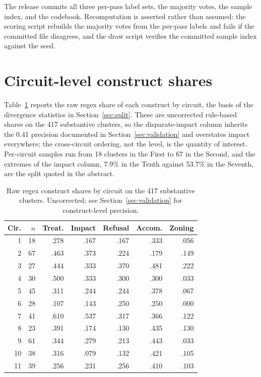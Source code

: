\documentclass[11pt]{article}
\begin{document}
The release commits all three per-pass label sets, the majority votes, the sample index, and the codebook. Recomputation is asserted rather than assumed: the scoring script rebuilds the majority votes from the per-pass labels and fails if the committed file disagrees, and the draw script verifies the committed sample index against the seed.

\section{Circuit-level construct shares}\label{app:circuit}

Table~\ref{tab:circuits} reports the raw regex share of each construct by circuit, the basis of the divergence statistics in Section~\ref{sec:split}. These are uncorrected rule-based shares on the 417 substantive clusters, so the disparate-impact column inherits the 0.41 precision documented in Section~\ref{sec:validation} and overstates impact everywhere; the cross-circuit ordering, not the level, is the quantity of interest. Per-circuit samples run from 18 clusters in the First to 67 in the Second, and the extremes of the impact column, 7.9\% in the Tenth against 53.7\% in the Seventh, are the split quoted in the abstract.

\begin{table}[h]
\centering\small
\setlength{\tabcolsep}{4pt}
\begin{tabular}{rrrrrrr}
\toprule
Cir. & $n$ & Treat. & Impact & Refusal & Accom. & Zoning \\
\midrule
1 & 18 & .278 & .167 & .167 & .333 & .056 \\
2 & 67 & .463 & .373 & .224 & .179 & .149 \\
3 & 27 & .444 & .333 & .370 & .481 & .222 \\
4 & 30 & .500 & .333 & .300 & .300 & .033 \\
5 & 45 & .311 & .244 & .244 & .378 & .067 \\
6 & 28 & .107 & .143 & .250 & .250 & .000 \\
7 & 41 & .610 & .537 & .317 & .366 & .122 \\
8 & 23 & .391 & .174 & .130 & .435 & .130 \\
9 & 61 & .344 & .279 & .213 & .443 & .033 \\
10 & 38 & .316 & .079 & .132 & .421 & .105 \\
11 & 39 & .256 & .231 & .256 & .410 & .103 \\
\bottomrule
\end{tabular}
\caption{Raw regex construct shares by circuit on the 417 substantive clusters. Uncorrected; see Section~\ref{sec:validation} for construct-level precision.}
\label{tab:circuits}
\end{table}
\end{document}
